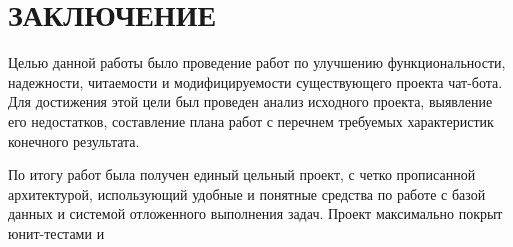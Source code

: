 \section*{ЗАКЛЮЧЕНИЕ}
Целью данной работы было проведение работ по улучшению
функциональности, надежности, читаемости и модифицируемости существующего проекта
чат-бота. Для достижения этой цели был проведен анализ исходного проекта, выявление
его недостатков, составление плана работ с перечнем требуемых характеристик конечного
результата.

По итогу работ была получен единый цельный проект, с четко прописанной архитектурой,
использующий удобные и понятные средства по работе с базой данных и
системой отложенного выполнения задач.
Проект максимально покрыт юнит-тестами и 
